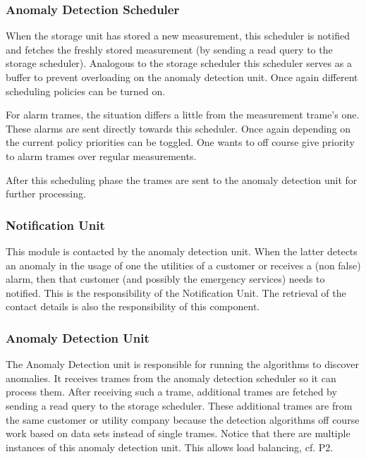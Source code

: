 \subsubsection{Anomaly Detection Scheduler}

\npar When the storage unit has stored a new measurement, this scheduler is
notified and fetches the freshly stored measurement (by sending a read query to
the storage scheduler). Analogous to the storage scheduler this scheduler serves
as a buffer to prevent overloading on the anomaly detection unit. Once again
different scheduling policies can be turned on.

\npar For alarm trames, the situation differs a little from the measurement
trame's one. These alarms are sent directly towards this scheduler. Once again
depending on the current policy priorities can be toggled. One wants to off
course give priority to alarm trames over regular measurements. 

\npar After this scheduling phase the trames are sent to the anomaly detection
unit for further processing.

\subsubsection{Notification Unit}

\npar This module is contacted by the anomaly detection unit. When the latter
detects an anomaly in the usage of one the utilities of a customer or
receives a (non false) alarm, then that customer (and possibly the emergency
services) needs to notified. This is the responsibility of the Notification
Unit. The retrieval of the contact details is also the responsibility of this
component.

\subsubsection{Anomaly Detection Unit}

\npar The Anomaly Detection unit is responsible for running the algorithms to
discover anomalies. It receives trames from the anomaly detection scheduler so
it can process them. After receiving such a trame, additional trames are fetched
by sending a read query to the storage scheduler. These additional trames
are from the same customer or utility company because the detection algorithms
off course work based on data sets instead of single trames. Notice that there
are multiple instances of this anomaly detection unit. This allows load
balancing, cf. P2.

